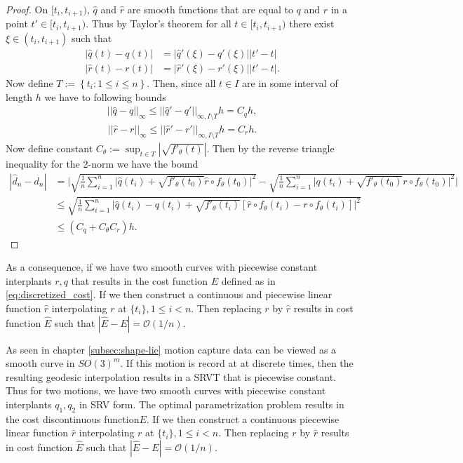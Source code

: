 \begin{proof}
  On  \([t_i, t_{i+1})\),  \(\hat q\) and  \(\hat r\) are smooth functions that are equal to  \(q\) and  \(r\) in a point  \(t' \in [t_i, t_{i+1})\). Thus by Taylor's theorem for all  \(t \in [t_i, t_{i+1})\) there exist  \(\xi \in (t_i, t_{i+1})\) such that
  \begin{eqnarray}
    |\hat q(t) - q(t)|  &= |\hat q'(\xi) - q'(\xi)||t' - t| \\
    |\hat r(t) - r(t)|  &= |\hat r'(\xi) - r'(\xi)||t' - t|.
  \end{eqnarray}
  Now define  \(T:= \left \{t_i : 1 \leq i \leq n \right \} \). Then, since all  \(t \in I\) are in some interval of length  \(h\) we have to following bounds
  \begin{eqnarray}
    ||\hat q - q||_{\infty} \leq ||\hat q' - q'||_{\infty, I \setminus T}h = C_q h,
  \end{eqnarray}
  \begin{eqnarray}
    ||\hat r - r||_{\infty} \leq ||\hat r' - r'||_{\infty, I \setminus T}h = C_r h.
  \end{eqnarray}
  Now define constant  \(C_{\theta}:= \sup_{t\in T} | \sqrt{f'_\theta(t)} | \). Then by the reverse triangle inequality for the 2-norm we have the bound
  \begin{align}
    |\hat d_n - d_n | 
      & = \Bigg| \sqrt{\frac{1}{n}\sum_{i=1}^{n}\Big|\hat q(t_i) + \sqrt{f'_{\theta}(t_0)} \hat r \circ f_{\theta}(t_0)\Big|^2}-\sqrt{\frac{1}{n}\sum_{i=1}^{n}\Big|q(t_i) + \sqrt{f'_{\theta}(t_0)} r \circ f_{\theta}(t_0)\Big|^2 } \Bigg|\\
     & \leq \sqrt{\frac{1}{n}\sum_{i=1}^{n}\Big|\hat q(t_i) - q(t_i)  + \sqrt{f'_{\theta}(t_i)}\left[  \hat r \circ f_{\theta}(t_i) - r \circ f_{\theta}(t_i)\right]\Big|^2}\\
     & \leq \left(C_q  + C_{\theta} C_r \right)h.
  \end{align}
\end{proof}

As a consequence, if we have two smooth curves with piecewise constant interplants \(r, q\) that results in the cost function \(E\) defined as in \eqref{eq:discretized_cost}. If we then construct a continuous and piecewise linear function \(\hat r\) interpolating \(r\) at \(\{t_i\}, 1 \leq i <n\). Then replacing \(r\) by \(\hat r\) results in cost function  \(\hat{E}\) such that \(|\hat{E} - E |= \mathcal{O}(1/n)\). 


As seen in chapter \ref{subsec:shape-lie} motion capture data can be viewed as a smooth curve in \({SO(3)}^m\). If this motion is record at at discrete times, then the resulting geodesic interpolation results in a SRVT that is piecewise constant. Thus for two motions, we have two smooth curves with piecewise constant interplants \(q_1, q_2\) in SRV form. The optimal parametrization problem results in the cost discontinuous function\(E\). If we then construct a continuous piecewise linear function \(\hat r\) interpolating \(r\) at \(\{t_i\}, 1 \leq i <n\). Then replacing \(r\) by \(\hat r\) results in cost function  \(\hat{E}\) such that \(|\hat{E} - E |= \mathcal{O}(1/n)\). 
